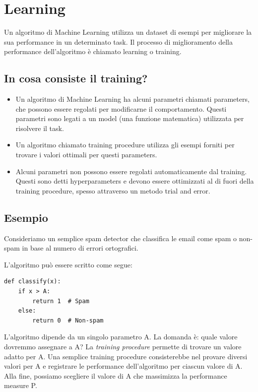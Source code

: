 \section{Learning}

Un algoritmo di Machine Learning utilizza un dataset di esempi per migliorare la sua performance in un determinato task. Il processo di miglioramento della performance dell'algoritmo è chiamato learning o training.

\subsection{In cosa consiste il training?}

\begin{itemize}
\item Un algoritmo di Machine Learning ha alcuni parametri chiamati parameters, che possono essere regolati per modificarne il comportamento. Questi parametri sono legati a un model (una funzione matematica) utilizzata per risolvere il task.
\item Un algoritmo chiamato training procedure utilizza gli esempi forniti per trovare i valori ottimali per questi parameters.
\item Alcuni parametri non possono essere regolati automaticamente dal training. Questi sono detti hyperparameters e devono essere ottimizzati al di fuori della training procedure, spesso attraverso un metodo trial and error.
\end{itemize}

\subsection{Esempio}

Consideriamo un semplice spam detector che classifica le email come spam o non-spam in base al numero di errori ortografici. 

\noindent
L'algoritmo può essere scritto come segue:

\newpage
\begin{lstlisting}[style=py,caption={Soglia sul numero di errori ortografici},label={lst:spam-threshold}]
def classify(x):
    if x > A:
        return 1  # Spam
    else:
        return 0  # Non-spam
\end{lstlisting}

\noindent
L'algoritmo dipende da un singolo parametro A. La domanda è: quale valore dovremmo assegnare a A? La \emph{training procedure} permette di trovare un valore adatto per A.
\noindent
Una semplice training procedure consisterebbe nel provare diversi valori per A e registrare le performance dell'algoritmo per ciascun valore di A. Alla fine, possiamo scegliere il valore di A che massimizza la performance measure P.
